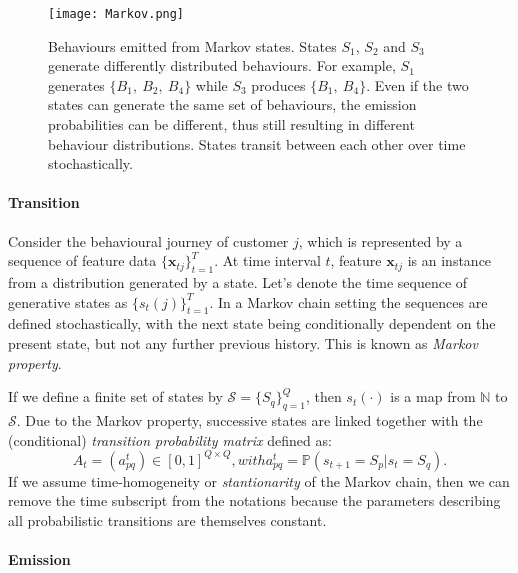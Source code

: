 \begin{figure}[!h]
\centering
\texttt{[image: Markov.png]}
\caption{Behaviours emitted from Markov states. States $S_1$, $S_2$ and $S_3$ generate differently distributed behaviours. For example, $S_1$ generates $\{ B_1, ~B_2, ~B_4\}$ while $S_3$ produces $\{ B_1, ~B_4\}$. Even if the two states can generate the same set of behaviours, the emission probabilities can be different, thus still resulting in different behaviour distributions. States transit between each other over time stochastically.}
\label{fig:markovChain}
\end{figure}

\paragraph*{Transition}

Consider the behavioural journey of customer $j$, which is represented by a sequence of feature data $\{ \mathbf{x}_{tj} \}_{t=1}^{T}$. At time interval $t$, feature $\mathbf{x}_{tj}$ is an instance from a distribution generated by a state. Let's denote the time sequence of generative states as $\{ s_{t}(j) \}_{t=1}^{T}$. In a Markov chain setting the sequences are defined stochastically, with the next state being conditionally dependent on the present state, but not any further previous history. This is known as \textit{Markov property}. 

If we define a finite set of states by $\mathcal{S} = \{ S_q \}_{q=1}^Q$, then $s_t (\cdot)$ is a map from $\mathbb{N}$ to $\mathcal{S}$. Due to the Markov property, successive states are linked together with the (conditional) \textit{transition probability matrix} defined as:
\begin{subequations}
\begin{equation}
A_t = (a_{pq}^t) \in [0,1]^{Q \times Q}, 
\end{equation}
with
\begin{equation}
a_{pq}^t = \mathbb{P} \left( s_{t+1} = S_p | s_t = S_q \right).
\end{equation}
\label{eq:transition}
\end{subequations}
If we assume time-homogeneity or \textit{stantionarity} of the Markov chain, then we can remove the time subscript from the notations because the parameters describing all probabilistic transitions are themselves constant.

\paragraph*{Emission}
\label{sec:emission}

